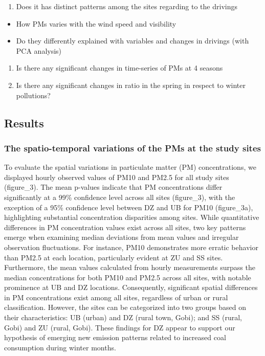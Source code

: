 \documentclass[
  11pt,
]{article}
\providecommand{\tightlist}{%
  \setlength{\itemsep}{0pt}\setlength{\parskip}{0pt}}
\begin{document}
\begin{enumerate}
\def\labelenumi{\arabic{enumi}.}
\setcounter{enumi}{3}
\tightlist
\item
  Does it has distinct patterns among the sites regarding to the
  drivings
\end{enumerate}

\begin{itemize}
\tightlist
\item
  How PMs varies with the wind speed and visibility
\item
  Do they differently explained with variables and changes in drivings
  (with PCA analysis)
\end{itemize}

\begin{enumerate}
\def\labelenumi{\arabic{enumi}.}
\setcounter{enumi}{4}
\tightlist
\item
  Is there any significant changes in time-series of PMs at 4 seasons
\item
  Is there any significant changes in ratio in the spring in respect to
  winter pollutions?
\end{enumerate}

\subsection{Results}\label{results}

\subsubsection{The spatio-temporal variations of the PMs at the study
sites}\label{the-spatio-temporal-variations-of-the-pms-at-the-study-sites}

To evaluate the spatial variations in particulate matter (PM)
concentrations, we displayed hourly observed values of PM10 and PM2.5
for all study sites (figure\_3). The mean p-values indicate that PM
concentrations differ significantly at a 99\% confidence level across
all sites (figure\_3), with the exception of a 95\% confidence level
between DZ and UB for PM10 (figure\_3a), highlighting substantial
concentration disparities among sites. While quantitative differences in
PM concentration values exist across all sites, two key patterns emerge
when examining median deviations from mean values and irregular
observation fluctuations. For instance, PM10 demonstrates more erratic
behavior than PM2.5 at each location, particularly evident at ZU and SS
sites. Furthermore, the mean values calculated from hourly measurements
surpass the median concentrations for both PM10 and PM2.5 across all
sites, with notable prominence at UB and DZ locations. Consequently,
significant spatial differences in PM concentrations exist among all
sites, regardless of urban or rural classification. However, the sites
can be categorized into two groups based on their characteristics: UB
(urban) and DZ (rural town, Gobi); and SS (rural, Gobi) and ZU (rural,
Gobi). These findings for DZ appear to support our hypothesis of
emerging new emission patterns related to increased coal consumption
during winter months.
\end{document}
